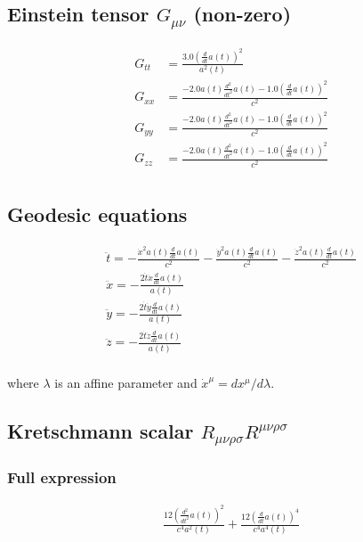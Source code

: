 \documentclass{article}
\begin{document}
\subsection{Einstein tensor $G_{\mu\nu}$ (non-zero)}
\begin{align}
G_{tt} &= \frac{3.0 \left(\frac{d}{d t} a{\left(t \right)}\right)^{2}}{a^{2}{\left(t \right)}} \\
G_{xx} &= \frac{- 2.0 a{\left(t \right)} \frac{d^{2}}{d t^{2}} a{\left(t \right)} - 1.0 \left(\frac{d}{d t} a{\left(t \right)}\right)^{2}}{c^{2}} \\
G_{yy} &= \frac{- 2.0 a{\left(t \right)} \frac{d^{2}}{d t^{2}} a{\left(t \right)} - 1.0 \left(\frac{d}{d t} a{\left(t \right)}\right)^{2}}{c^{2}} \\
G_{zz} &= \frac{- 2.0 a{\left(t \right)} \frac{d^{2}}{d t^{2}} a{\left(t \right)} - 1.0 \left(\frac{d}{d t} a{\left(t \right)}\right)^{2}}{c^{2}} \\
\end{align}

\subsection{Geodesic equations}
\begin{align}
\ddot{t} = - \frac{\dot{x}^{2} a{\left(t \right)} \frac{d}{d t} a{\left(t \right)}}{c^{2}} - \frac{\dot{y}^{2} a{\left(t \right)} \frac{d}{d t} a{\left(t \right)}}{c^{2}} - \frac{\dot{z}^{2} a{\left(t \right)} \frac{d}{d t} a{\left(t \right)}}{c^{2}} \\
\ddot{x} = - \frac{2 \dot{t} \dot{x} \frac{d}{d t} a{\left(t \right)}}{a{\left(t \right)}} \\
\ddot{y} = - \frac{2 \dot{t} \dot{y} \frac{d}{d t} a{\left(t \right)}}{a{\left(t \right)}} \\
\ddot{z} = - \frac{2 \dot{t} \dot{z} \frac{d}{d t} a{\left(t \right)}}{a{\left(t \right)}} \\
\end{align}

where $\lambda$ is an affine parameter and $\dot{x}^\mu = dx^\mu/d\lambda$.

\subsection{Kretschmann scalar $R_{\mu\nu\rho\sigma}R^{\mu\nu\rho\sigma}$}
\subsubsection*{Full expression}
\begin{align}
\frac{12 \left(\frac{d^{2}}{d t^{2}} a{\left(t \right)}\right)^{2}}{c^{4} a^{2}{\left(t \right)}} + \frac{12 \left(\frac{d}{d t} a{\left(t \right)}\right)^{4}}{c^{4} a^{4}{\left(t \right)}}
\end{align}
\end{document}
